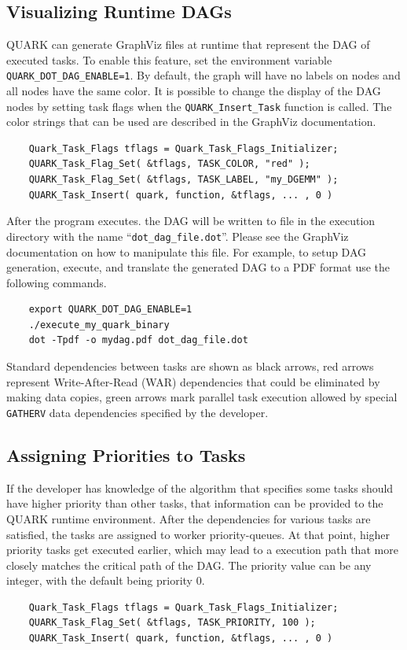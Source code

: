 \documentclass[11pt,letterpaper]{report}
\begin{document}
\subsection{Visualizing Runtime DAGs}
QUARK can generate GraphViz \cite{Ellson:2002:Graphviz-Open} files at
runtime that represent the DAG of executed tasks.  To enable this
feature, set the environment variable \verb|QUARK_DOT_DAG_ENABLE=1|.
By default, the graph will have no labels on nodes and all nodes have
the same color.  It is possible to change the display of the DAG nodes
by setting task flags when the \verb|QUARK_Insert_Task| function is
called.  The color strings that can be used are described in the
GraphViz documentation.
\begin{samepage}
\begin{lstlisting}
    Quark_Task_Flags tflags = Quark_Task_Flags_Initializer;
    QUARK_Task_Flag_Set( &tflags, TASK_COLOR, "red" );
    QUARK_Task_Flag_Set( &tflags, TASK_LABEL, "my_DGEMM" );
    QUARK_Task_Insert( quark, function, &tflags, ... , 0 )
\end{lstlisting}
\end{samepage}
After the program executes. the DAG will be written to file in the
execution directory with the name ``\verb|dot_dag_file.dot|''.  Please
see the GraphViz documentation on how to manipulate this file.  For
example, to setup DAG generation, execute, and translate the generated
DAG to a PDF format use the following commands.
\begin{samepage}
\begin{lstlisting}
    export QUARK_DOT_DAG_ENABLE=1
    ./execute_my_quark_binary
    dot -Tpdf -o mydag.pdf dot_dag_file.dot
\end{lstlisting}
\end{samepage}
Standard dependencies between tasks are shown as black arrows, red
arrows represent Write-After-Read (WAR) dependencies that could be
eliminated by making data copies, green arrows mark parallel task
execution allowed by special \verb|GATHERV| data dependencies
specified by the developer.


\subsection{Assigning Priorities to Tasks}
If the developer has knowledge of the algorithm that specifies some
tasks should have higher priority than other tasks, that information
can be provided to the QUARK runtime environment.  After the
dependencies for various tasks are satisfied, the tasks are assigned
to worker priority-queues.  At that point, higher priority tasks get
executed earlier, which may lead to a execution path that more closely
matches the critical path of the DAG.  The priority value can be any
integer, with the default being priority 0.
\begin{samepage}
\begin{lstlisting}
    Quark_Task_Flags tflags = Quark_Task_Flags_Initializer;
    QUARK_Task_Flag_Set( &tflags, TASK_PRIORITY, 100 );
    QUARK_Task_Insert( quark, function, &tflags, ... , 0 )
\end{lstlisting}
\end{samepage}
\end{document}
